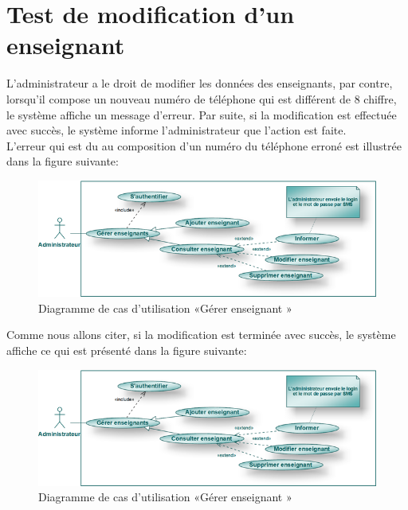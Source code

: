 \documentclass[12 pt ]{report}
\begin{document}
\section{Test de modification d'un enseignant}
L'administrateur a le droit de modifier les données des enseignants, par contre, lorsqu'il compose un nouveau numéro de téléphone qui est différent de 8 chiffre, le système affiche un message d'erreur. Par suite, si la modification est effectuée avec succès, le système informe l'administrateur que l'action est faite. \\
L'erreur qui est du au composition d'un numéro du téléphone erroné est illustrée dans la figure suivante:
 \begin{figure}[h]
 \begin{center}
 \includegraphics[width= 13 cm ,height= 6 cm]{admin2.png}
\caption{ Diagramme de cas d'utilisation  «Gérer enseignant »}
 \end{center}
\end{figure}
Comme nous allons citer, si la modification est terminée avec succès, le système affiche ce qui est présenté dans la figure suivante:
\begin{figure}[h]
 \begin{center}
 \includegraphics[width= 13 cm ,height= 6 cm]{admin2.png}
\caption{ Diagramme de cas d'utilisation  «Gérer enseignant »}
 \end{center}
\end{figure}
\end{document}
